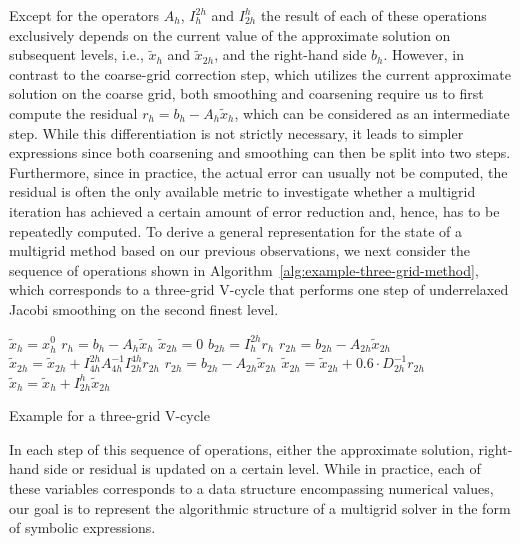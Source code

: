 Except for the operators $A_h$, $I_h^{2h}$ and $I_{2h}^h$ the result of each of these operations exclusively depends on the current value of the approximate solution on subsequent levels, i.e., $\tilde{x}_{h}$ and $\tilde{x}_{2h}$, and the right-hand side $b_h$.
However, in contrast to the coarse-grid correction step, which utilizes the current approximate solution on the coarse grid, both smoothing and coarsening require us to first compute the residual $r_h = b_h - A_h \tilde{x}_h$, which can be considered as an intermediate step.
While this differentiation is not strictly necessary, it leads to simpler expressions since both coarsening and smoothing can then be split into two steps.
Furthermore, since in practice, the actual error can usually not be computed, the residual is often the only available metric to investigate whether a multigrid iteration has achieved a certain amount of error reduction and, hence, has to be repeatedly computed.
To derive a general representation for the state of a multigrid method based on our previous observations, we next consider the sequence of operations shown in Algorithm~\ref{alg:example-three-grid-method}, which corresponds to a three-grid V-cycle that performs one step of underrelaxed Jacobi smoothing on the second finest level.
\begin{algorithm}
	\begin{algorithmic}[1]
		\State $\tilde{x}_{h} = x_{h}^0$
		\State $r_{h} = b_{h} - A_h \tilde{x}_{h} $
		\State $ \tilde{x}_{2h} = 0$
		\State $ b_{2h} = I_{h}^{2h} r_{h}$
		\State $ r_{2h} = b_{2h} - A_{2h} \tilde{x}_{2h}$
		\State $ \tilde{x}_{2h} = \tilde{x}_{2h} + I_{4h}^{2h} A_{4h}^{-1} I_{2h}^{4h} r_{2h}$
		\State $ r_{2h} = b_{2h} - A_{2h} \tilde{x}_{2h}$
		\State $ \tilde{x}_{2h} = \tilde{x}_{2h} + 0.6 \cdot D_{2h}^{-1} r_{2h}$
		\State $\tilde{x}_{h} = \tilde{x}_{h}  + I_{2h}^h \tilde{x}_{2h}$
	\end{algorithmic}
\caption{Example for a three-grid V-cycle}
\label{alg:example-three-grid-method}
\end{algorithm}
In each step of this sequence of operations, either the approximate solution, right-hand side or residual is updated on a certain level.
While in practice, each of these variables corresponds to a data structure encompassing numerical values, our goal is to represent the algorithmic structure of a multigrid solver in the form of symbolic expressions.
